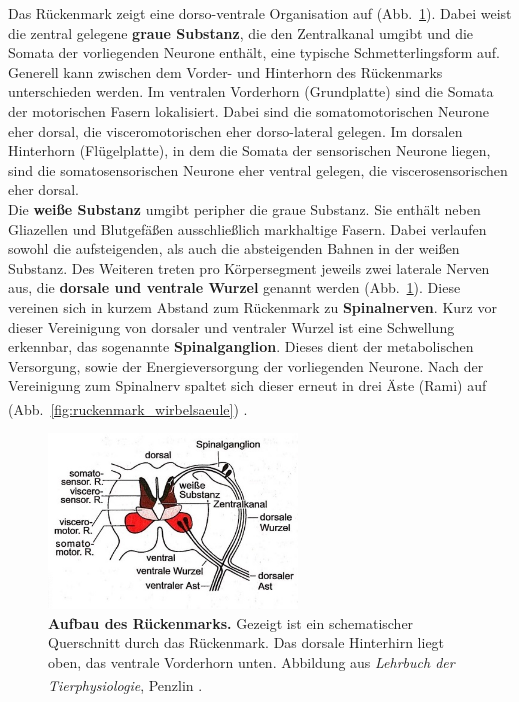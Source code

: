 \documentclass[12pt,a4paper,pdftex]{article}
\begin{document}
Das Rückenmark zeigt eine dorso-ventrale Organisation auf (Abb.~\ref{fig:ruckenmark_schema}). Dabei weist die zentral gelegene \textbf{graue Substanz}, die den Zentralkanal umgibt und die Somata der vorliegenden Neurone enthält, eine typische Schmetterlingsform auf. Generell kann zwischen dem Vorder- und Hinterhorn des Rückenmarks unterschieden werden. Im ventralen Vorderhorn (Grundplatte) sind die Somata der motorischen Fasern lokalisiert. Dabei sind die somatomotorischen Neurone eher dorsal, die visceromotorischen eher dorso-lateral gelegen. Im dorsalen Hinterhorn (Flügelplatte), in dem die Somata der sensorischen Neurone liegen, sind die somatosensorischen Neurone eher ventral gelegen, die viscerosensorischen eher dorsal.\\

\noindent Die \textbf{weiße Substanz} umgibt peripher die graue Substanz. Sie enthält neben Gliazellen und Blutgefäßen ausschließlich markhaltige Fasern. Dabei verlaufen sowohl die aufsteigenden, als auch die absteigenden Bahnen in der weißen Substanz. Des Weiteren treten pro Körpersegment jeweils zwei laterale Nerven aus, die \textbf{dorsale und ventrale Wurzel} genannt werden (Abb.~\ref{fig:ruckenmark_schema}). Diese vereinen sich in kurzem Abstand zum Rückenmark zu \textbf{Spinalnerven}. Kurz vor dieser Vereinigung von dorsaler und ventraler Wurzel ist eine Schwellung erkennbar, das sogenannte \textbf{Spinalganglion}. Dieses dient der metabolischen Versorgung, sowie der Energieversorgung der vorliegenden Neurone. Nach der Vereinigung zum Spinalnerv spaltet sich dieser erneut in drei Äste (Rami) auf (Abb.~\ref{fig:ruckenmark_wirbelsaeule}) \textsuperscript{\cite[14]{penzlin2005tierphys}}.

\begin{figure}[H]
     \centering
     \includegraphics[width=0.59\textwidth]{pictures/Bilder_Jule/Andere/rueckenmark_schema.jpg}
     \caption[Aufbau des Rückenmarks]{\textbf{Aufbau des Rückenmarks.} Gezeigt ist ein schematischer Querschnitt durch das Rückenmark. Das dorsale Hinterhirn liegt oben, das ventrale Vorderhorn unten. Abbildung aus \textit{Lehrbuch der Tierphysiologie}, Penzlin \textsuperscript{\cite[14]{penzlin2005tierphys}}.}
     \label{fig:ruckenmark_schema}
 \end{figure}{}
\end{document}
